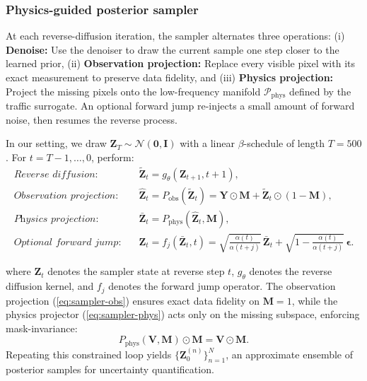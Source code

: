 \documentclass[a4paper,fleqn]{cas-sc}
\numberwithin{equation}{section}
\begin{document}
\subsubsection{Physics-guided posterior sampler}
At each reverse-diffusion iteration, the sampler alternates three operations:
(i) \textbf{Denoise:} Use the denoiser to draw the current sample one step closer to the learned prior, 
(ii) \textbf{Observation projection:} Replace every visible pixel with its exact measurement to preserve data fidelity, 
and (iii) \textbf{Physics projection:} Project the missing pixels onto the low-frequency manifold $\mathcal P_{\text{phys}}$ defined by the traffic surrogate.
An optional forward jump re-injects a small amount of forward noise, then resumes the reverse process. 

In our setting, we draw $\mathbf Z_T\sim\mathcal N(\mathbf 0,\mathbf I)$ with a linear $\beta$-schedule of length $T=500$.
For $t=T{-}1,\ldots,0$, perform:
\begin{align}
\textit{Reverse diffusion:}&\quad
\tilde{\mathbf Z}_{t}=g_{\theta}(\mathbf Z_{t+1},t+1),
\label{eq:sampler-rev}\\[4pt]
\textit{Observation projection:}&\quad
\hat{\mathbf Z}_{t}=P_{\text{obs}}(\tilde{\mathbf Z}_{t})
=\mathbf Y\odot\mathbf M+\tilde{\mathbf Z}_{t}\odot(1-\mathbf M),
\label{eq:sampler-obs}\\[4pt]
\textit{Physics projection:}&\quad
\bar{\mathbf Z}_{t}=P_{\text{phys}}(\hat{\mathbf Z}_{t},\mathbf M),
\label{eq:sampler-phys}\\[4pt]
\textit{Optional forward jump:}&\quad
\mathbf Z_{t}=f_{j}(\bar{\mathbf Z}_{t},t)
=\sqrt{\frac{\alpha(t)}{\alpha(t+j)}}\,\bar{\mathbf Z}_{t}
+\sqrt{1-\frac{\alpha(t)}{\alpha(t+j)}}\,\boldsymbol\epsilon.
\label{eq:sampler-fwd}
\end{align}

where $\mathbf Z_t$ denotes the sampler state at reverse step $t$, $g_{\theta}$ denotes the reverse diffusion kernel, and $f_j$ denotes the forward jump operator.
The observation projection (\ref{eq:sampler-obs}) ensures exact data fidelity on $\mathbf M=1$, while the physics projector (\ref{eq:sampler-phys}) acts only on the missing subspace, enforcing mask-invariance:
\begin{equation}
    P_{\text{phys}}(\mathbf{V},\mathbf M)\odot\mathbf M = \mathbf V\odot\mathbf M.
\end{equation}
Repeating this constrained loop yields $\{\mathbf Z_0^{(n)}\}_{n=1}^N$, an approximate ensemble of posterior samples for uncertainty quantification.
\end{document}
